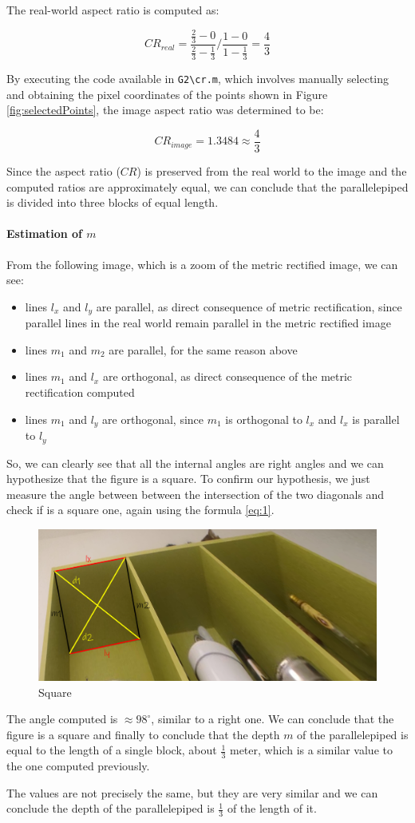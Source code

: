 The real-world aspect ratio is computed as:

$$CR_{real} = \frac{\frac{2}{3} - 0}{\frac{2}{3} - \frac{1}{3}} / \frac{1 - 0}{1 - \frac{1}{3}} = \frac{4}{3}$$

By executing the code available in \verb|G2\cr.m|, which involves manually selecting and obtaining the pixel coordinates of the points shown in Figure \ref{fig:selectedPoints}, the image aspect ratio was determined to be:

$$CR_{image} = 1.3484 \approx \frac{4}{3}$$

Since the aspect ratio ($CR$) is preserved from the real world to the image and the computed ratios are approximately equal, we can conclude that the parallelepiped is divided into three blocks of equal length.

\paragraph{Estimation of $m$}
From the following image, which is a zoom of the metric rectified image, we can see:
\begin{itemize}
    \item lines $l_x$ and $l_y$ are parallel, as direct consequence of metric rectification, since parallel lines in the real world remain parallel in the metric rectified image 
    \item lines $m_1$ and $m_2$ are parallel, for the same reason above
    \item lines $m_1$ and $l_x$ are orthogonal, as direct consequence of the metric rectification computed
    \item lines $m_1$ and $l_y$ are orthogonal, since $m_1$ is orthogonal to $l_x$ and $l_x$ is parallel to $l_y$ 
\end{itemize}
\label{square}
So, we can clearly see that all the internal angles are right angles and we can hypothesize that the figure is a square. To confirm our hypothesis, we just measure the angle between between the intersection of the two diagonals and check if is a square one, again using the formula \ref{eq:1}.

\begin{figure}[H]
    \centering
    \includegraphics[width=0.5\linewidth]{img/square.png}
    \caption{Square}
    \label{fig:square}
\end{figure}

The angle computed is $\approx 98^{\circ}$, similar to a right one. We can conclude that the figure is a square and finally to conclude that the depth $m$ of the parallelepiped is equal to the length of a single block, about $\frac{1}{3}$ meter, which is a similar value to the one computed previously.

The values are not precisely the same, but they are very similar and we can conclude the depth of the parallelepiped is $\frac{1}{3}$ of the length of it.